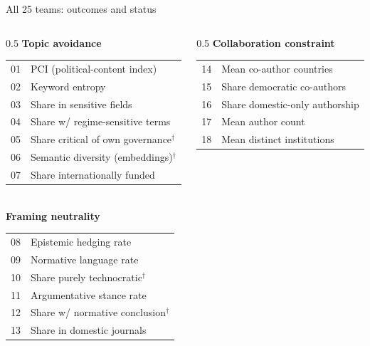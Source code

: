 \documentclass[aspectratio=169,11pt]{beamer}
\begin{document}
\begin{frame}{All 25 teams: outcomes and status}
  \hypertarget{ap:teams}{}
  \scriptsize
  \begin{columns}[T]
    \begin{column}{0.5\textwidth}
      \textbf{Topic avoidance}\\[0.2em]
      \begin{tabular}{@{}r@{\;}l@{}}
        01 & PCI (political-content index)\\
        02 & Keyword entropy\\
        03 & Share in sensitive fields\\
        04 & Share w/ regime-sensitive terms\\
        05 & Share critical of own governance$^\dagger$\\
        06 & Semantic diversity (embeddings)$^\dagger$\\
        07 & Share internationally funded\\
      \end{tabular}\\[0.5em]
      \textbf{Framing neutrality}\\[0.2em]
      \begin{tabular}{@{}r@{\;}l@{}}
        08 & Epistemic hedging rate\\
        09 & Normative language rate\\
        10 & Share purely technocratic$^\dagger$\\
        11 & Argumentative stance rate\\
        12 & Share w/ normative conclusion$^\dagger$\\
        13 & Share in domestic journals\\
      \end{tabular}
    \end{column}
    \begin{column}{0.5\textwidth}
      \textbf{Collaboration constraint}\\[0.2em]
      \begin{tabular}{@{}r@{\;}l@{}}
        14 & Mean co-author countries\\
        15 & Share democratic co-authors\\
        16 & Share domestic-only authorship\\
        17 & Mean author count\\
        18 & Mean distinct institutions\\
      \end{tabular}\\[0.5em]

\end{column}
\end{columns}
\end{frame}
\end{document}
